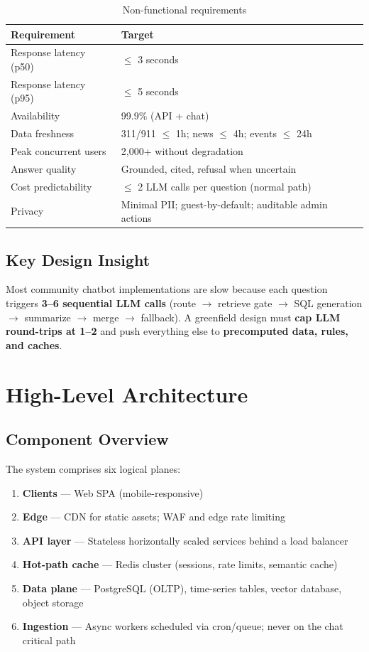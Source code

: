 \documentclass[11pt,a4paper]{article}
\begin{document}
\begin{table}[h]
\centering
\small
\begin{tabular}{@{}ll@{}}
\toprule
\textbf{Requirement} & \textbf{Target} \\
\midrule
Response latency (p50) & $\leq$ 3 seconds \\
Response latency (p95) & $\leq$ 5 seconds \\
Availability & 99.9\% (API + chat) \\
Data freshness & 311/911 $\leq$ 1h; news $\leq$ 4h; events $\leq$ 24h \\
Peak concurrent users & 2,000+ without degradation \\
Answer quality & Grounded, cited, refusal when uncertain \\
Cost predictability & $\leq$ 2 LLM calls per question (normal path) \\
Privacy & Minimal PII; guest-by-default; auditable admin actions \\
\bottomrule
\end{tabular}
\caption{Non-functional requirements}
\end{table}

\subsection{Key Design Insight}
Most community chatbot implementations are slow because each question triggers \textbf{3--6 sequential LLM calls} (route $\rightarrow$ retrieve gate $\rightarrow$ SQL generation $\rightarrow$ summarize $\rightarrow$ merge $\rightarrow$ fallback). A greenfield design must \textbf{cap LLM round-trips at 1--2} and push everything else to \textbf{precomputed data, rules, and caches}.

\section{High-Level Architecture}

\subsection{Component Overview}
The system comprises six logical planes:

\begin{enumerate}[noitemsep]
  \item \textbf{Clients} --- Web SPA (mobile-responsive)
  \item \textbf{Edge} --- CDN for static assets; WAF and edge rate limiting
  \item \textbf{API layer} --- Stateless horizontally scaled services behind a load balancer
  \item \textbf{Hot-path cache} --- Redis cluster (sessions, rate limits, semantic cache)
  \item \textbf{Data plane} --- PostgreSQL (OLTP), time-series tables, vector database, object storage
  \item \textbf{Ingestion} --- Async workers scheduled via cron/queue; never on the chat critical path
\end{enumerate}
\end{document}
